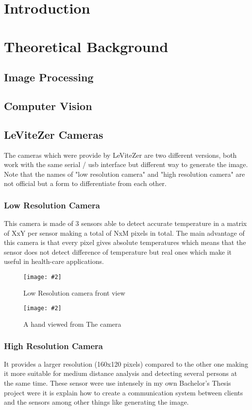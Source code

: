 \documentclass[hidelinks,11pt,a4paper,oneside,article]{memoir}
\newcommand{\putimage}[3][10] %
{
    \begin{figure}[h]
        \centering
        \captionsetup{justification=centering}
        \texttt{[image: \#2]}
        \caption{#3}
        \label{fig:#2}
    \end{figure}
}
\begin{document}
	\setcounter{page}{1} %
	\ClearWallPaper
	
	\sloppy %
	
	\chapter{Introduction}
	
    
    \clearpage	
	\chapter{Theoretical Background}
    \section{Image Processing}
    \section{Computer Vision}
    \section{LeViteZer Cameras}
    The cameras which were provide by LeViteZer are two different versions, both work with the same serial / \gls{usb} interface but different way to generate the image. Note that the names of "low resolution camera" and "high resolution camera" are not official but a form to differentiate from each other. 
    \subsection{Low Resolution Camera}
    This camera is made of 3 sensors able to detect accurate temperature in a matrix of XxY per sensor making a total of NxM pixels in total. The main advantage of this camera is that every pixel gives absolute temperatures which means that the sensor does not detect difference of temperature but real ones which make it useful in health-care applications. %
    \putimage{low-resolution}{Low Resolution camera front view}
    \putimage{hand}{A hand viewed from The camera}
    \subsection{High Resolution Camera}
    It provides a larger resolution (160x120 pixels) compared to the other one making it more suitable for medium distance analysis  and detecting several persons at the same time. These sensor were use intensely in my own Bachelor's Thesis project were it is explain how to create a communication system between clients and the sensors among other things like generating the image. 
    
\end{document}

